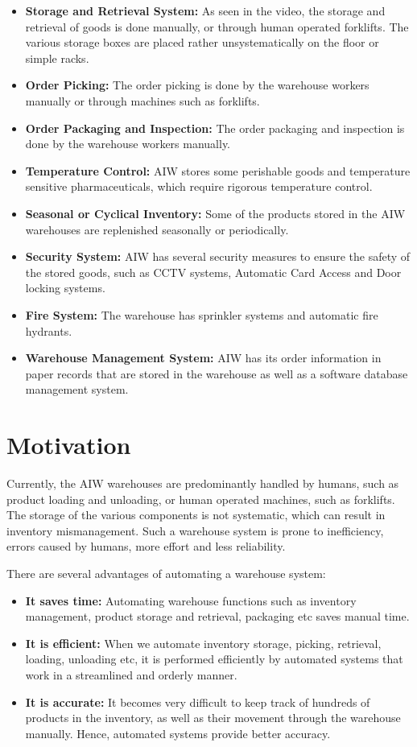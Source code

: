 \documentclass{report}
\begin{document}
\begin{itemize}
    \item {\bfseries Storage and Retrieval System:} As seen in the video, the storage and retrieval of goods is done manually, or through human operated forklifts. The various storage boxes are placed rather unsystematically on the floor or simple racks.
    \item {\bfseries Order Picking:} The order picking is done by the warehouse workers manually or through machines such as forklifts.
    \item {\bfseries Order Packaging and Inspection:} The order packaging and inspection is done by the warehouse workers manually.
    \item {\bfseries Temperature Control:} AIW stores some perishable goods and temperature sensitive pharmaceuticals, which require rigorous temperature control.
    \item {\bfseries Seasonal or Cyclical Inventory:} Some of the products stored in the AIW warehouses are replenished seasonally or periodically.
    \item {\bfseries Security System:} AIW has several security measures to ensure the safety of the stored goods, such as CCTV systems, Automatic Card Access and Door locking systems.
    \item {\bfseries Fire System:} The warehouse has sprinkler systems and automatic fire hydrants.
    \item {\bfseries Warehouse Management System:} AIW has its order information in paper records that are stored in the warehouse as well as a software database management system.
\end{itemize}

\section{Motivation}

Currently, the AIW warehouses are predominantly handled by humans, such as product loading and unloading, or human operated machines, such as forklifts. The storage of the various components is not systematic, which can result in inventory mismanagement. Such a warehouse system is prone to inefficiency, errors caused by humans, more effort and less reliability. 

There are several advantages of automating a warehouse system:

\begin{itemize}
    \item {\bfseries It saves time:} Automating warehouse functions such as inventory management, product storage and retrieval, packaging etc saves manual time.
    \item {\bfseries It is efficient:} When we automate inventory storage, picking, retrieval, loading, unloading etc, it is performed efficiently by automated systems that work in a streamlined and orderly manner.
    \item {\bfseries It is accurate:} It becomes very difficult to keep track of hundreds of products in the inventory, as well as their movement through the warehouse manually. Hence, automated systems provide better accuracy.
\end{itemize}
\end{document}

